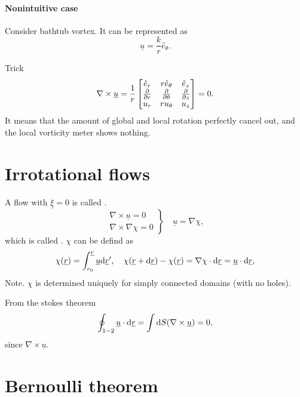 \documentclass[11pt,oneside]{book}
\renewcommand{\vec}[1]{\underline{#1}}
\theoremstyle{definition} %
\theoremstyle{plain} %
\theoremstyle{remark} %
\theoremstyle{underline}
\begin{document}
  \paragraph{Nonintuitive case}
  Consider bathtub vortex.
  It can be represented as
  \begin{displaymath}
    \vec u = \frac{k}{r} \hat{e}_\theta.
  \end{displaymath}
  
  Trick
  \begin{displaymath}
    \nabla \times \vec u = \frac{1}{r} \begin{bmatrix}
      \ver & r \hat{e} _\theta & \hat{e}_z\\
      \ptf{}{r} & \ptf{}{\theta} & \ptf{}{z} \\
      u_r & r u_\theta & u_z
    \end{bmatrix} = 0.
  \end{displaymath}
  It means that the amount of global and local rotation perfectly cancel out, and the local vorticity meter 
  shows nothing.

  \section{Irrotational flows}
  
  A flow with $\vec \xi = 0$ is called .
  \begin{displaymath}
    \left.\begin{matrix}
      \nabla \times \vec u = 0 \\
      \nabla \times \nabla \chi = 0 
    \end{matrix}\right\} \quad \vec u =  \nabla \chi,
  \end{displaymath}
  which is called .
  $\chi$ can be defind as
  \begin{displaymath}
    \chi(\vec r) = \int_{r_0}^{\vec r} \vec u \d \vec r', 
    \quad \chi(\vec r + \d \vec r) - \chi(\vec r) = \nabla \chi \cdot \d \vec r = \vec u \cdot \d \vec r,
  \end{displaymath}
  Note. $\chi$ is determined uniquely for simply connected domains (with no holes).

  From the stokes theorem
  \begin{displaymath}
    \oint_{1-2} \vec u \cdot \d \vec r = \int\d S( \nabla \times \vec u) = 0, 
  \end{displaymath}
  since $\nabla \times \vec u$.
  
  \section{Bernoulli theorem}
\end{document}
